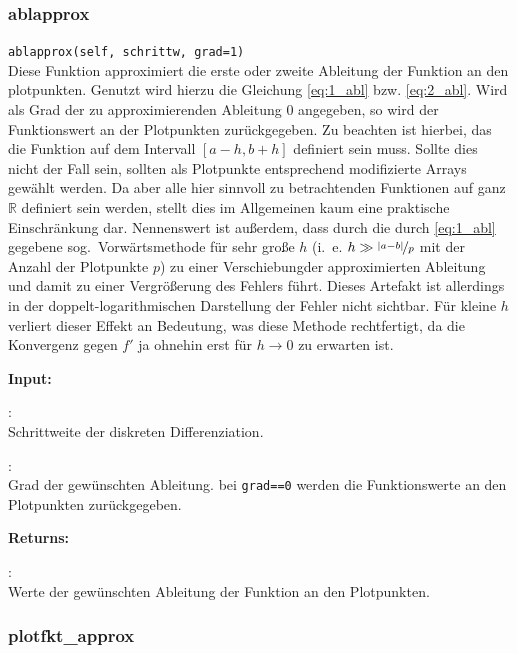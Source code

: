 \documentclass[smallheadings]{scrartcl}
\newcommand{\initem}[2]{\item[\hspace{0.5em} {\normalfont\ttfamily{#1}} {\normalfont\itshape{(#2)}}]}
\newcommand{\bfpara}[1]{
	
	\noindent \textbf{#1:}\,}
\begin{document}
\subsubsection{ablapprox}

\texttt{ablapprox(self, schrittw, grad=1)}\\
 Diese Funktion approximiert die erste oder zweite Ableitung der Funktion
        an den plotpunkten. Genutzt wird hierzu die Gleichung \eqref{eq:1_abl} bzw. \eqref{eq:2_abl}. Wird als Grad der zu approximierenden Ableitung 0
        angegeben, so wird der Funktionswert an der Plotpunkten zurückgegeben.
Zu beachten ist hierbei, das die Funktion auf dem Intervall $\left[a-h,b+h\right]$ definiert sein muss. Sollte dies nicht
der Fall sein, sollten als Plotpunkte entsprechend modifizierte Arrays gewählt werden. Da aber alle hier sinnvoll zu betrachtenden Funktionen auf ganz $\mathbb{R}$ definiert sein werden, stellt dies im Allgemeinen kaum eine praktische Einschränkung dar. 
Nennenswert ist außerdem, dass durch die durch \eqref{eq:1_abl} gegebene sog.~Vorwärtsmethode  für sehr große $h$
(i.~e. $h\gg\nicefrac{\vert a-b\vert}{p}$ mit der Anzahl der Plotpunkte $p$) zu einer \glqq Verschiebung\grqq der approximierten Ableitung und damit zu einer Vergrößerung des Fehlers führt. Dieses Artefakt ist allerdings in der doppelt-logarithmischen Darstellung der Fehler nicht sichtbar. Für kleine $h$ verliert dieser Effekt an Bedeutung, was diese Methode rechtfertigt, da die Konvergenz gegen $f'$ ja ohnehin erst für $h\rightarrow 0$ zu erwarten ist.


\bfpara{Input}
	    \begin{compactdesc}
		    \initem{schrittw}{float}: ~\\ Schrittweite der diskreten Differenziation.
		    \initem{grad}{int, optional, Standard: 1}: ~\\ Grad der gewünschten Ableitung. bei \texttt{grad==0} werden die Funktionswerte
                an den Plotpunkten zurückgegeben.
	    \end{compactdesc}
\bfpara{Returns}
       \begin{compactdesc}
		    \initem{~}{numpy.ndarray aus floats}: ~\\ Werte der gewünschten Ableitung der Funktion an den Plotpunkten.
	    \end{compactdesc}


\subsubsection{plotfkt\_approx}
\end{document}
